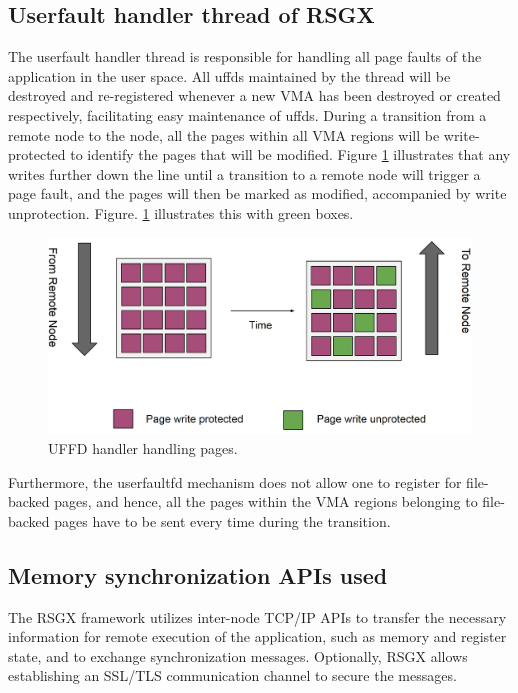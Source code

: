 \documentclass[article, doublespace,nopageskip]{VTthesis} %
\newcommand{\monitor}{RSGX \xspace}
\begin{document}
    \subsection{Userfault handler thread of \monitor} \label{ase:userfaultfd handler}
    The userfault handler thread is responsible for handling all page faults of the application in the user space. All uffds maintained by the thread will be destroyed and re-registered whenever a new VMA has been destroyed or created respectively, facilitating easy maintenance of uffds. During a transition from a remote node to the node, all the pages within all VMA regions will be write-protected to identify the pages that will be modified. Figure \ref{fig:uffd_handler} illustrates that any writes further down the line until a transition to a remote node will trigger a page fault, and the pages will then be marked as modified, accompanied by write unprotection. Figure. \ref{fig:uffd_handler} illustrates this with green boxes.

    \begin{figure}[htb]
        \centering
        \includegraphics[scale=0.7]{figures/uffd_handler.png}
        \caption{UFFD handler handling pages.} 
        \label{fig:uffd_handler}
    \end{figure}

    Furthermore, the userfaultfd mechanism does not allow one to register for file-backed pages, and hence, all the pages within the VMA regions belonging to file-backed pages have to be sent every time during the transition. 
    
    \subsection{Memory synchronization APIs used} \label{ase:memsync_api}
    The \monitor framework utilizes inter-node TCP/IP APIs to transfer the necessary information for remote execution of the application, such as memory and register state, and to exchange synchronization messages. Optionally, \monitor allows establishing an SSL/TLS communication channel to secure the messages. 
\end{document}
